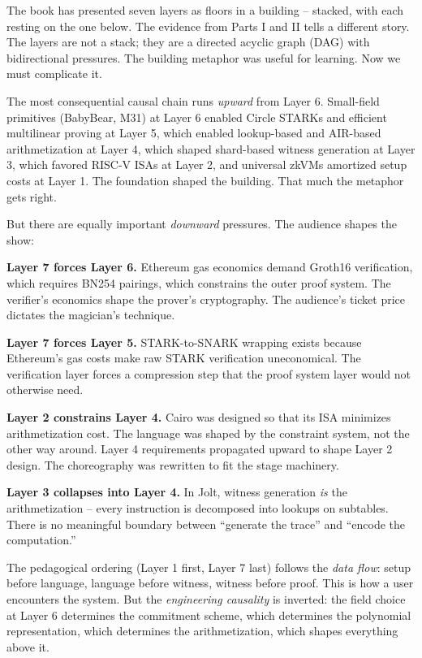 \documentclass[
  11pt,
  openany]{report}
\renewcommand{\textbf}[1]{{\bfseries\color{MidnightBold}#1}}
\begin{document}
The book has presented seven layers as floors in a building -- stacked, with
each resting on the one below. The evidence from Parts I and II tells a
different story. The layers are not a stack; they are a directed acyclic graph
(DAG) with bidirectional pressures. The building metaphor was useful for
learning. Now we must complicate it.

The most consequential causal chain runs \emph{upward} from Layer 6. Small-field
primitives (BabyBear, M31) at Layer 6 enabled Circle STARKs and efficient
multilinear proving at Layer 5, which enabled lookup-based and AIR-based
arithmetization at Layer 4, which shaped shard-based witness generation at Layer
3, which favored RISC-V ISAs at Layer 2, and universal zkVMs amortized setup
costs at Layer 1. The foundation shaped the building. That much the metaphor
gets right.

But there are equally important \emph{downward} pressures. The audience shapes
the show:

\textbf{Layer 7 forces Layer 6.} Ethereum gas economics demand Groth16
verification, which requires BN254 pairings, which constrains the outer proof
system. The verifier's economics shape the prover's cryptography. The audience's
ticket price dictates the magician's technique.

\textbf{Layer 7 forces Layer 5.} STARK-to-SNARK wrapping exists because
Ethereum's gas costs make raw STARK verification uneconomical. The verification
layer forces a compression step that the proof system layer would not otherwise
need.

\textbf{Layer 2 constrains Layer 4.} Cairo was designed so that its ISA
minimizes arithmetization cost. The language was shaped by the constraint
system, not the other way around. Layer 4 requirements propagated upward to
shape Layer 2 design. The choreography was rewritten to fit the stage machinery.

\textbf{Layer 3 collapses into Layer 4.} In Jolt, witness generation \emph{is}
the arithmetization -- every instruction is decomposed into lookups on
subtables. There is no meaningful boundary between ``generate the trace'' and
``encode the computation.''

The pedagogical ordering (Layer 1 first, Layer 7 last) follows the \emph{data
flow}: setup before language, language before witness, witness before proof.
This is how a user encounters the system. But the \emph{engineering causality}
is inverted: the field choice at Layer 6 determines the commitment scheme, which
determines the polynomial representation, which determines the arithmetization,
which shapes everything above it.
\end{document}
